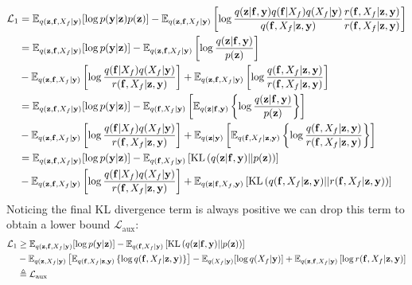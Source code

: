 \documentclass[12pt]{article}
\newcommand{\zb}{\mathbf{z}}
\newcommand{\fb}{\mathbf{f}}
\newcommand{\yb}{\mathbf{y}}
\newcommand{\Lo}{\mathcal{L}_1}
\newcommand{\Laux}{\mathcal{L}_{\mathrm{aux}}}
\newcommand{\Ex}{\mathbb{E}}
\newcommand{\KL}{\mathrm{KL}}
\begin{document}
\begin{align}
\Lo &= \Ex_{q(\zb,\fb,X_f|\yb)}[\log p(\yb|\zb)p(\zb)] - \Ex_{q(\zb,\fb,X_f|\yb)}\left[\log\frac{q(\zb |\fb, \yb)q(\fb|X_f)q(X_f|\yb)}{q(\fb,X_f | \zb,\yb)} \frac{r(\fb,X_f|\zb,\yb)}{r(\fb,X_f|\zb,\yb)}\right] \\
&= \Ex_{q(\zb,\fb,X_f|\yb)}[\log p(\yb|\zb)] - \Ex_{q(\zb,\fb,X_f|\yb)}\left[\log\frac{q(\zb|\fb,\yb)}{p(\zb)}\right] \notag \\
&-\Ex_{q(\zb,\fb,X_f|\yb)}\left[\log\frac{q(\fb|X_f)q(X_f|\yb)}{r(\fb,X_f|\zb,\yb)}\right] + \Ex_{q(\zb,\fb,X_f|\yb)}\left[\log\frac{q(\fb,X_f|\zb,\yb)}{r(\fb,X_f|\zb,\yb)}\right] \\
&= \Ex_{q(\zb,\fb,X_f|\yb)}[\log p(\yb|\zb)] - \Ex_{q(\fb,X_f|\yb)}\left[\Ex_{q(\zb|\fb,\yb)}\left\{\log\frac{q(\zb|\fb,\yb)}{p(\zb)}\right\}\right] \notag \\
&-\Ex_{q(\zb,\fb,X_f|\yb)}\left[\log\frac{q(\fb|X_f)q(X_f|\yb)}{r(\fb,X_f|\zb,\yb)}\right] + \Ex_{q(\zb|\yb)}\left[\Ex_{q(\fb,X_f|\zb,\yb)}\left\{\log\frac{q(\fb,X_f|\zb,\yb)}{r(\fb,X_f|\zb,\yb)}\right\}\right] \\
&= \Ex_{q(\zb,\fb,X_f|\yb)}[\log p(\yb|\zb)] - \Ex_{q(\fb,X_f|\yb)}\left[\KL\left(q(\zb|\fb,\yb)||p(\zb)\right)\right] \notag \\
&-\Ex_{q(\zb,\fb,X_f|\yb)}\left[\log\frac{q(\fb|X_f)q(X_f|\yb)}{r(\fb,X_f|\zb,\yb)}\right] + \Ex_{q(\zb|\fb,X_f,\yb)}\left[\KL\left(q(\fb,X_f|\zb,\yb)||r(\fb,X_f|\zb,\yb)\right)\right]
\end{align}
%
Noticing the final KL divergence term is always positive we can drop this term to obtain a lower bound $\Laux:$
%
\begin{align}
\Lo &\ge \Ex_{q(\zb,\fb,X_f|\yb)}[\log p(\yb|\zb)] - \Ex_{q(\fb,X_f|\yb)}\left[\KL\left(q(\zb|\fb,\yb)||p(\zb)\right)\right] \notag \\
&- \Ex_{q(\zb,X_f|\yb)}\left[ \Ex_{q(\fb,X_f|\zb,\yb)}\left\{\log q(\fb,X_f|\zb,\yb) \right\} \right] - \Ex_{q(X_f|\yb)}[\log q(X_f|\yb)] + \Ex_{q(\zb,\fb,X_f|\yb)}\left[ \log r(\fb,X_f|\zb,\yb) \right] \\
&\triangleq \Laux
\end{align}
%
\end{document}
